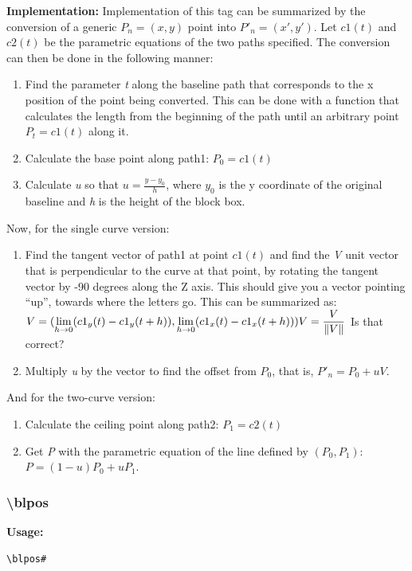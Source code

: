 \documentclass{spec}
\begin{document}
\textbf{Implementation:}
Implementation of this tag can be summarized by the conversion of a generic $P_n = (x,y)$ point into
$P'_n = (x',y')$. Let $c1(t)$ and $c2(t)$ be the parametric equations of the two paths specified.
The conversion can then be done in the following manner:

\begin{enumerate}
\item Find the parameter \emph{t} along the baseline path that corresponds to the x position of
the point being converted. This can be done with a function that calculates the length from the
beginning of the path until an arbitrary point $P_t = c1(t)$ along it.
\item Calculate the base point along path1: $P_0 = c1(t)$
\item Calculate \emph{u} so that $u = \frac{y-y_0}{h}$, where $y_0$ is the y coordinate of the original
baseline and \emph{h} is the height of the block box.
\end{enumerate}

Now, for the single curve version:

\begin{enumerate}
\item Find the tangent vector of path1 at point $c1(t)$ and find the \emph{V} unit vector that is
perpendicular to the curve at that point, by rotating the tangent vector by -90 degrees along the Z axis.
This should give you a vector pointing ``up'', towards where the letters go. This can be summarized as:\\
$\displaystyle V = ( \lim_{h \to 0} (c1_y(t)-c1_y(t+h)) , \lim _{h\to0} (c1_x(t)-c1_x(t+h)))\\
V = \frac{V}{\left \| V \right \|}\\$
\todo Is that correct?
\item Multiply \emph{u} by the vector to find the offset from $P_0$, that is, $P'_n = P_0 + u V$.
\end{enumerate}

And for the two-curve version:

\begin{enumerate}
\item Calculate the ceiling point along path2: $P_1 = c2(t)$
\item Get \emph{P} with the parametric equation of the line defined by $(P_0,P_1)$: $P = (1-u) P_0 + u P_1$.
\end{enumerate}

\subsubsection{\textbackslash blpos}
\textbf{Usage:}
\begin{verbatim}
\blpos#
\end{verbatim}
\end{document}
